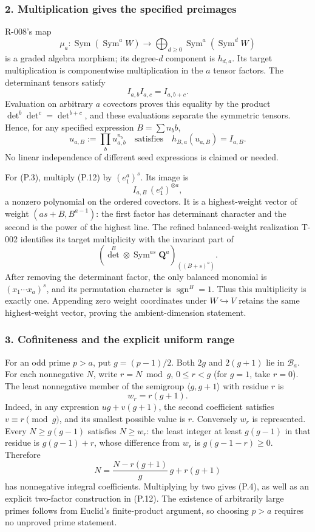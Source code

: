 \documentclass[
  10pt,
]{article}
\begin{document}
\subsubsection{2. Multiplication gives the specified
preimages}\label{multiplication-gives-the-specified-preimages}

R-008's map \[
 \mu_a:\operatorname{Sym}(\operatorname{Sym}^a W)
 \longrightarrow \bigoplus_{d\ge0}\operatorname{Sym}^a(\operatorname{Sym}^d W)
\] is a graded algebra morphism; its degree-\(d\) component is
\(h_{d,a}\). Its target multiplication is componentwise multiplication
in the \(a\) tensor factors. The determinant tensors satisfy \[
 I_{a,b}I_{a,c}=I_{a,b+c}.
\tag{P.11}
\] Evaluation on arbitrary \(a\) covectors proves this equality by the
product \(\det^b\det^c=\det^{b+c}\), and these evaluations separate the
symmetric tensors. Hence, for any specified expression \(B=\sum n_b b\),
\[
 u_{a,B}:=\prod_b u_{a,b}^{n_b}
 \quad\text{satisfies}\quad h_{B,a}(u_{a,B})=I_{a,B}.
\tag{P.12}
\] No linear independence of different seed expressions is claimed or
needed.

For (P.3), multiply (P.12) by \((e_1^a)^s\). Its image is \[
 I_{a,B}\,(e_1^s)^{\otimes a},
\tag{P.13}
\] a nonzero polynomial on the ordered covectors. It is a highest-weight
vector of weight \((as+B,B^{a-1})\): the first factor has determinant
character and the second is the power of the highest line. The refined
balanced-weight realization T-002 identifies its target multiplicity
with the invariant part of \[
 \left(\det^B\otimes\operatorname{Sym}^{as}\mathbf Q^a\right)_{((B+s)^a)}.
\] After removing the determinant factor, the only balanced monomial is
\((x_1\cdots x_a)^s\), and its permutation character is
\(\operatorname{sgn}^B=1\). Thus this multiplicity is exactly one.
Appending zero weight coordinates under \(W\hookrightarrow V\) retains
the same highest-weight vector, proving the ambient-dimension statement.

\subsubsection{3. Cofiniteness and the explicit uniform
range}\label{cofiniteness-and-the-explicit-uniform-range}

For an odd prime \(p>a\), put \(g=(p-1)/2\). Both \(2g\) and \(2(g+1)\)
lie in \(\mathcal B_a\). For each nonnegative \(N\), write
\(r=N\bmod g\), \(0\le r<g\) (for \(g=1\), take \(r=0\)). The least
nonnegative member of the semigroup \(\langle g,g+1\rangle\) with
residue \(r\) is \[
 w_r=r(g+1).
\tag{P.14}
\] Indeed, in any expression \(ug+v(g+1)\), the second coefficient
satisfies \(v\equiv r\pmod g\), and its smallest possible value is
\(r\). Conversely \(w_r\) is represented. Every \(N\ge g(g-1)\)
satisfies \(N\ge w_r\): the least integer at least \(g(g-1)\) in that
residue is \(g(g-1)+r\), whose difference from \(w_r\) is
\(g(g-1-r)\ge0\). Therefore \[
 N=\frac{N-r(g+1)}g\,g+r(g+1)
\tag{P.15}
\] has nonnegative integral coefficients. Multiplying by two gives
(P.4), as well as an explicit two-factor construction in (P.12). The
existence of arbitrarily large primes follows from Euclid's
finite-product argument, so choosing \(p>a\) requires no unproved prime
statement.
\end{document}
